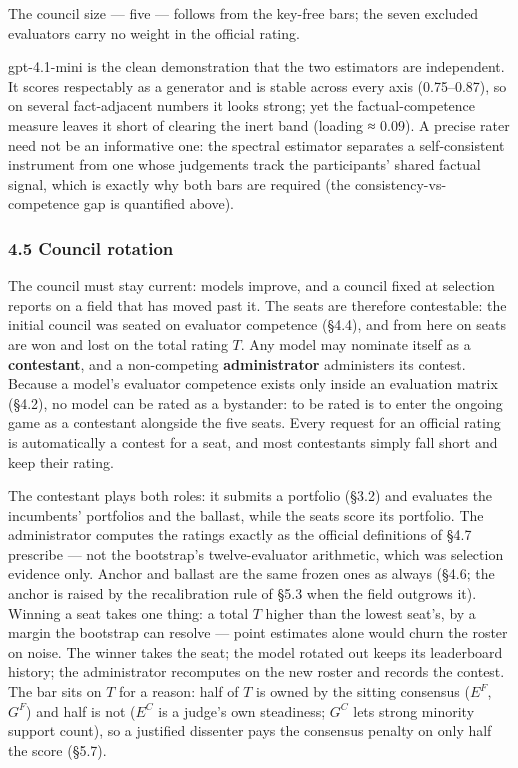 The council size --- five --- follows from the key-free bars; the seven excluded evaluators carry no weight in the official rating.

gpt-4.1-mini is the clean demonstration that the two estimators are independent. It scores respectably as a generator and is stable across every axis (0.75--0.87), so on several fact-adjacent numbers it looks strong; yet the factual-competence measure leaves it short of clearing the inert band (loading ≈ 0.09). A precise rater need not be an informative one: the spectral estimator separates a self-consistent instrument from one whose judgements track the participants' shared factual signal, which is exactly why both bars are required (the consistency-vs-competence gap is quantified above).

\subsubsection{4.5 Council rotation}\label{council-rotation}

The council must stay current: models improve, and a council fixed at selection reports on a field that has moved past it. The seats are therefore contestable: the initial council was seated on evaluator competence (§4.4), and from here on seats are won and lost on the total rating \(T\). Any model may nominate itself as a \textbf{contestant}, and a non-competing \textbf{administrator} administers its contest. Because a model's evaluator competence exists only inside an evaluation matrix (§4.2), no model can be rated as a bystander: to be rated is to enter the ongoing game as a contestant alongside the five seats. Every request for an official rating is automatically a contest for a seat, and most contestants simply fall short and keep their rating.

The contestant plays both roles: it submits a portfolio (§3.2) and evaluates the incumbents' portfolios and the ballast, while the seats score its portfolio. The administrator computes the ratings exactly as the official definitions of §4.7 prescribe --- not the bootstrap's twelve-evaluator arithmetic, which was selection evidence only. Anchor and ballast are the same frozen ones as always (§4.6; the anchor is raised by the recalibration rule of §5.3 when the field outgrows it). Winning a seat takes one thing: a total \(T\) higher than the lowest seat's, by a margin the bootstrap can resolve --- point estimates alone would churn the roster on noise. The winner takes the seat; the model rotated out keeps its leaderboard history; the administrator recomputes on the new roster and records the contest. The bar sits on \(T\) for a reason: half of \(T\) is owned by the sitting consensus (\(E^{F}\), \(G^{F}\)) and half is not (\(E^{C}\) is a judge's own steadiness; \(G^{C}\) lets strong minority support count), so a justified dissenter pays the consensus penalty on only half the score (§5.7).

